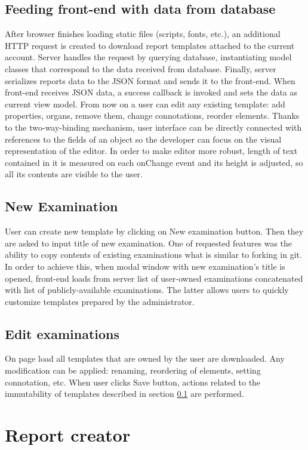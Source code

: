 \documentclass[12pt, twoside, openany]{report}
\theoremstyle{definition}
\begin{document}
\subsection{Feeding front-end with data from database}\label{templates-immutable}
After browser finishes loading static files (scripts, fonts, etc.), an additional HTTP request is created to download report templates attached to the current account. Server handles the request by querying database, instantiating model classes that correspond to the data received from database. Finally, server serializes reports data to the JSON format and sends it to the front-end. When front-end receives JSON data, a success callback is invoked and sets the data as current view model. 
From now on a user can edit any existing template: add properties, organs, remove them, change connotations, reorder elements. Thanks to the two-way-binding mechanism, user interface can be directly connected with references to the fields of an object so the developer can focus on the visual representation of the editor. In order to make editor more robust, length of text contained in it is measured on each onChange event and its height is adjusted, so all its contents are visible to the user.
\subsection{New Examination}
User can create new template by clicking on New examination button. Then they are asked to input title of new examination. One of requested features was the ability to copy contents of existing examinations what is similar to forking in git. In order to achieve this, when modal window with new examination's title is opened, front-end loads from server list of user-owned examinations concatenated with list of publicly-available examinations. The latter allows users to quickly customize templates prepared by the administrator.

\subsection{Edit examinations}
On page load all templates that are owned by the user are downloaded. Any modification can be applied: renaming, reordering of elements, setting connotation, etc. When user clicks Save button, actions related to the immutability of templates described in section \ref{templates-immutable} are performed.


\section{Report creator}
\end{document}
